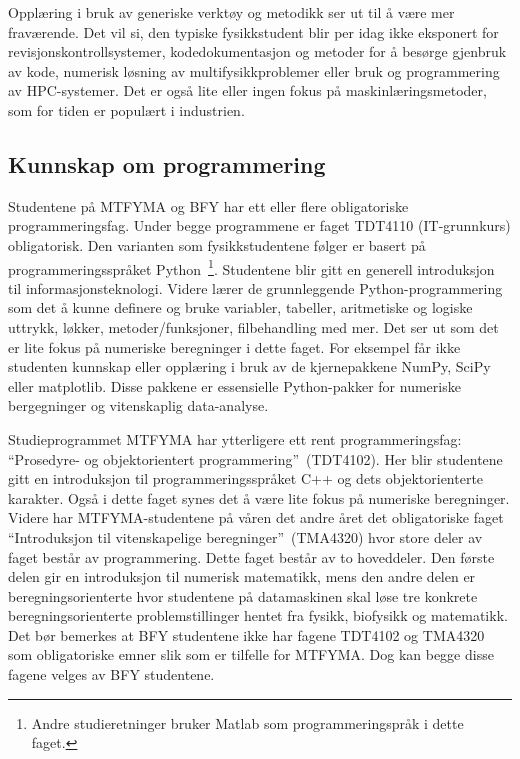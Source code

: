 \documentclass{article}
\begin{document}
Opplæring i bruk av generiske verktøy og metodikk ser ut til å være mer fraværende. Det vil si, den typiske fysikkstudent blir per idag ikke eksponert for revisjonskontrollsystemer, kodedokumentasjon og metoder for å besørge gjenbruk av kode, numerisk løsning av multifysikkproblemer eller bruk og programmering av HPC-systemer. Det er også lite eller ingen fokus på maskinlæringsmetoder, som for tiden er populært i industrien.

\subsection{Kunnskap om programmering}
\label{Sec:Programming}
Studentene på MTFYMA og BFY har ett eller flere obligatoriske programmeringsfag. Under begge programmene er faget TDT4110 (IT-grunnkurs) obligatorisk. Den varianten som fysikkstudentene følger er basert på programmeringsspråket Python~\footnote{Andre studieretninger bruker Matlab som programmeringspråk i dette faget.}. Studentene blir gitt en generell introduksjon til informasjonsteknologi. Videre lærer de grunnleggende Python-programmering som det å kunne definere og bruke variabler, tabeller, aritmetiske og logiske uttrykk, løkker, metoder/funksjoner, filbehandling med mer. Det ser ut som det er lite fokus på numeriske beregninger i dette faget. For eksempel får ikke studenten kunnskap eller opplæring i bruk av de kjernepakkene NumPy, SciPy eller matplotlib. Disse pakkene er essensielle Python-pakker for numeriske bergegninger og vitenskaplig data-analyse.

Studieprogrammet MTFYMA har ytterligere ett rent programmeringsfag: ``Prosedyre- og objektorientert programmering''~(TDT4102). Her blir studentene gitt en introduksjon til programmeringsspråket C++ og dets objektorienterte karakter. Også i dette faget synes det å være lite fokus på numeriske beregninger. Videre har MTFYMA-studentene på våren det andre året det obligatoriske faget ``Introduksjon til vitenskapelige beregninger''~(TMA4320) hvor store deler av faget består av programmering. Dette faget består av to hoveddeler. Den første delen gir en introduksjon til numerisk matematikk, mens den andre delen er beregningsorienterte hvor studentene på datamaskinen skal løse tre konkrete beregningsorienterte problemstillinger hentet fra fysikk, biofysikk og matematikk. Det bør bemerkes at BFY studentene ikke har fagene TDT4102 og TMA4320 som obligatoriske emner slik som er tilfelle for MTFYMA. Dog kan begge disse fagene velges av BFY studentene.
\end{document}
